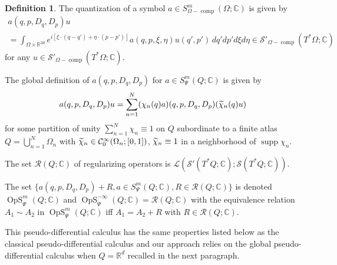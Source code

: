 \documentclass[10pt]{amsart}
\theoremstyle{definition}\newtheorem{defi}[theo]{Definition}\newtheorem{rema}[theo]{Remark}\newtheorem{exam}[theo]{Example}\newtheorem{exem}[theo]{Example}\newtheorem{nota}[theo]{Notation}
\newcommand{\C}{\mathbb{C}}
\newcommand{\R}{\mathbb{R}}
\newcommand{\clC}{\mathcal{C}}
\newcommand{\clS}{\mathcal{S}}
\newcommand{\clL}{\mathcal{L}}
\newcommand{\clR}{\mathcal{R}}
\DeclareMathOperator{\OpS}{OpS}
\DeclareMathOperator{\ccomp}{comp}
\DeclareMathOperator{\suppp}{supp}
\let\oldtilde\tilde
\renewcommand*{\tilde}[1]{\mathchoice{\widetilde{#1}}{\widetilde{#1}}{\oldtilde{#1}}{\oldtilde{#1}}}
\begin{document}
\begin{defi}\label{def:quantiz}
The quantization of a symbol $a\in S^{m}_{\Omega-\ccomp}(\Omega;\C)$ is given by
\begin{multline*}
a(q,p,D_{q},D_{p})u\\
=\int_{\Omega\times \R^{3d}}e^{i[{\xi\cdot(q-q')+\eta\cdot(p-p')}]}a(q,p,\xi,\eta)u(q',p')\,dq'dp'd\xi d\eta
\in \clS'_{\Omega-\ccomp}(T^{*}\Omega;\C)
\end{multline*}
for any $u\in \clS'_{\Omega-\ccomp}(T^{*}\Omega;\C)$.

The global definition of $a(q,p,D_{q},D_{p})$ for $a\in S^{m}_{\Psi}(Q;\C)$ is given by
\begin{equation}\label{eq:quantchi}
a(q,p,D_{q},D_{p})u=\sum_{n=1}^{N}(\chi_{n}(q)a)(q,p,D_{q},D_{p}) (\tilde{\chi}_{n}(q)u)
\end{equation}
for some partition of unity $\sum_{n=1}^{N}\chi_{n}\equiv 1$ on $Q$ subordinate to a finite atlas $Q=\bigcup_{n=1}^{N}\Omega_{n}$ with $\tilde{\chi}_{n}\in \clC^{\infty}_{0}(\Omega_{n};[0,1])$, $\tilde{\chi}_{n}\equiv 1$ in a neighborhood of $\suppp\chi_{n}$.

The set $\clR(Q;\C)$ of regularizing operators is $ \clL(\clS'(T^{*}Q;\C);\clS(T^{*}Q;\C))$.

The set $\{a(q,p,D_{q},D_{p})+R , a\in S^{m}_{\Psi}(Q;\C) , R\in \clR(Q;\C)\}$ is denoted $\OpS^{m}_{\Psi}(Q;\C)$ and $\OpS^{-\infty}_{\Psi}(Q;\C)=\clR(Q;\C)$ with the equivalence relation $A_{1}\sim A_{2}$ in $\OpS^{m}_{\Psi}(Q;\C)$ iff $A_{1}=A_{2}+R$ with $R\in \clR(Q;\C)$.
\end{defi}

This pseudo-differential calculus has the same properties listed below as the classical pseudo-differential calculus and our approach relies on the global pseudo-differential calculus when $Q=\R^{d}$ recalled in the next paragraph.
\end{document}
